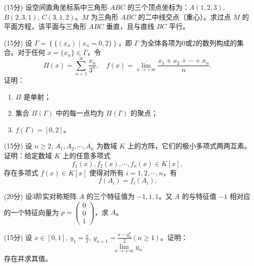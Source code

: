 \documentclass[loose]{ExBook}
\begin{document}
\begin{qitems}

    \begin{bbox}
        \qitem (15分) 设空间直角坐标系中三角形 \(ABC\) 的三个顶点坐标为：\(A(1,2,3)\), \(B(2,3,1)\), \(C(3,1,2)\)。\(M\) 为三角形 \(ABC\) 的二中线交点（重心）。求过点 \(M\) 的平面方程，该平面与三角形 \(ABC\) 垂直，且与直线 \(BC\) 平行。
    \end{bbox}

    \begin{bbox}
        \qitem (15分) 设 \(\Gamma = \left\{ \{(x_n)\mid x_n = 0,2\} \right\}\)，即 \(\Gamma\) 为全体各项为0或2的数列构成的集合。对于任何 \(x = \{x_n\} \in \Gamma\)，令
        \[
        \Pi(x) = \sum_{n=1}^{\infty} \frac{x_n}{3^n}, \quad f(x) = \overline{\lim_{n \to +\infty}} \frac{x_1 + x_2 + \cdots + x_n}{n}.
        \]
        证明：
        \begin{enumerate}[label=(\arabic*)]
            \item \(\Pi\) 是单射；
            \item 集合 \(\Pi(\Gamma)\) 中的每一点均为 \(\Pi(\Gamma)\) 的聚点；
            \item \(f(\Gamma) = [0,2]\)。
        \end{enumerate}
    \end{bbox}

    \begin{bbox}
        \qitem (15分) 设 \(n \geq 2\), \(A_1, A_2, \cdots, A_n\) 为数域 \(K\) 上的方阵，它们的极小多项式两两互素。证明：给定数域 \(K\) 上的任意多项式
        \[
        f_1(x), f_2(x), \cdots, f_n(x) \in K[x],
        \]
        存在多项式 \(f(x) \in K[x]\) 使得对所有 \(i = 1, 2, \cdots, n\)，有
        \[
        f(A_i) = f_i(A_i).
        \]
    \end{bbox}

    \begin{bbox}
        \qitem (20分) 设3阶实对称矩阵 \(A\) 的三个特征值为 \(-1, 1, 1\)。又 \(A\) 的与特征值 \(-1\) 相对应的一个特征向量为 \(p = 
        \begin{pmatrix}
        0 \\
        0 \\
        1
        \end{pmatrix}\)，求 \(A\)。
    \end{bbox}

    \begin{bbox}
        \qitem (15分) 设 \(x \in [0,1]\), \(y_1 = \frac{x}{2}\), \(y_{n+1} = \frac{x - y_n^2}{2} (n \geq 1)\)。证明：
        \[
        \lim_{n \to +\infty} y_n
        \]
        存在并求其值。
    \end{bbox}


\end{qitems}
\end{document}
